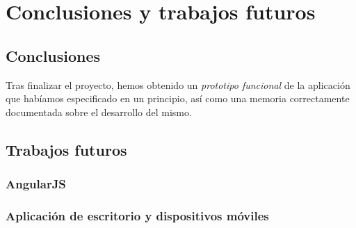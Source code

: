 \chapter{Conclusiones y trabajos futuros}
\label{cap:conclusiones}

\section{Conclusiones}

Tras finalizar el proyecto, hemos obtenido un \textit{prototipo funcional} de la aplicación que habíamos especificado en un principio, así como una memoria correctamente documentada sobre el desarrollo del mismo.

\section{Trabajos futuros}

\subsection{AngularJS}

\subsection{Aplicación de escritorio y dispositivos móviles}
